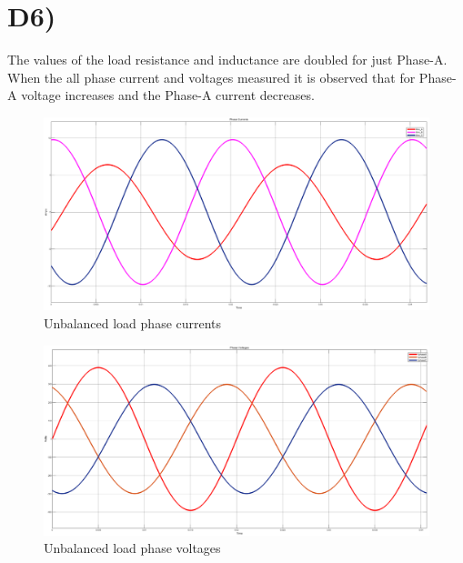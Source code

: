 \documentclass[letterpaper,12pt]{article}
\begin{document}
\section{D6)}
The values of the load resistance and inductance are doubled for just Phase-A. When the all phase current and voltages measured it is observed that for Phase-A voltage increases and the Phase-A current decreases.
\begin{figure}[H]
    \centering
    \includegraphics[width = 1\textwidth]{6_1.png}
    \caption{Unbalanced load phase currents}
    \label{D6_1}
\end{figure}
\begin{figure}[H]
    \centering
    \includegraphics[width = 1\textwidth]{6_2.png}
    \caption{Unbalanced load phase voltages}
    \label{D6_2}
\end{figure}
\end{document}
